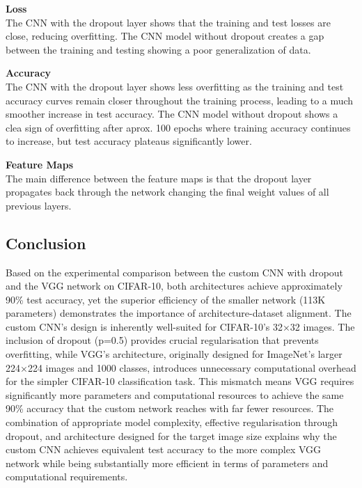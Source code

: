 \textbf{Loss}\\
The CNN with the dropout layer shows that the training and test losses are close, reducing overfitting. The CNN model without dropout creates a gap between the training and testing showing a poor generalization of data.

\textbf{Accuracy}\\
The CNN with the dropout layer shows less overfitting as the training and test accuracy curves remain closer throughout the training process, leading to a much smoother increase in test accuracy. The CNN model without dropout shows a clea sign of overfitting after aprox. 100 epochs where training accuracy continues to increase, but test accuracy plateaus significantly lower.

\textbf{Feature Maps}\\
The main difference between the feature maps is that the dropout layer propagates back through the network changing the final weight values of all previous layers.\\

\subsection*{Conclusion}
Based on the experimental comparison between the custom CNN with dropout and the VGG network on CIFAR-10, both architectures achieve approximately 90\% test accuracy, yet the superior efficiency of the smaller network (113K parameters) demonstrates the importance of architecture-dataset alignment. The custom CNN's design is inherently well-suited for CIFAR-10's 32×32 images. The inclusion of dropout (p=0.5) provides crucial regularisation that prevents overfitting, while VGG's architecture, originally designed for ImageNet's larger 224×224 images and 1000 classes, introduces unnecessary computational overhead for the simpler CIFAR-10 classification task. This mismatch means VGG requires significantly more parameters and computational resources to achieve the same 90\% accuracy that the custom network reaches with far fewer resources.  The combination of appropriate model complexity, effective regularisation through dropout, and architecture designed for the target image size explains why the custom CNN achieves equivalent test accuracy to the more complex VGG network while being substantially more efficient in terms of parameters and computational requirements.





